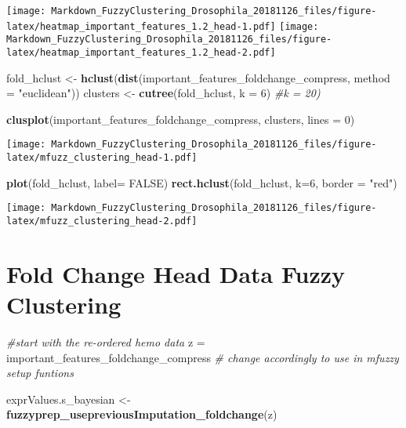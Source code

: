 \documentclass[]{article}
\newenvironment{Shaded}{\begin{snugshade}}{\end{snugshade}}
\newcommand{\KeywordTok}[1]{\textcolor[rgb]{0.13,0.29,0.53}{\textbf{#1}}}
\newcommand{\DataTypeTok}[1]{\textcolor[rgb]{0.13,0.29,0.53}{#1}}
\newcommand{\DecValTok}[1]{\textcolor[rgb]{0.00,0.00,0.81}{#1}}
\newcommand{\StringTok}[1]{\textcolor[rgb]{0.31,0.60,0.02}{#1}}
\newcommand{\CommentTok}[1]{\textcolor[rgb]{0.56,0.35,0.01}{\textit{#1}}}
\newcommand{\OtherTok}[1]{\textcolor[rgb]{0.56,0.35,0.01}{#1}}
\newcommand{\NormalTok}[1]{#1}
\begin{document}
\texttt{[image: Markdown\_FuzzyClustering\_Drosophila\_20181126\_files/figure-latex/heatmap\_important\_features\_1.2\_head-1.pdf]}
\texttt{[image: Markdown\_FuzzyClustering\_Drosophila\_20181126\_files/figure-latex/heatmap\_important\_features\_1.2\_head-2.pdf]}

\begin{Shaded}
\begin{Highlighting}[]
\NormalTok{fold_hclust <-}\StringTok{ }\KeywordTok{hclust}\NormalTok{(}\KeywordTok{dist}\NormalTok{(important_features_foldchange_compress, }\DataTypeTok{method =} \StringTok{"euclidean"}\NormalTok{))}
\NormalTok{clusters <-}\StringTok{ }\KeywordTok{cutree}\NormalTok{(fold_hclust, }\DataTypeTok{k =} \DecValTok{6}\NormalTok{) }\CommentTok{#k = 20)}

\KeywordTok{clusplot}\NormalTok{(important_features_foldchange_compress, clusters, }\DataTypeTok{lines =} \DecValTok{0}\NormalTok{)}
\end{Highlighting}
\end{Shaded}

\texttt{[image: Markdown\_FuzzyClustering\_Drosophila\_20181126\_files/figure-latex/mfuzz\_clustering\_head-1.pdf]}

\begin{Shaded}
\begin{Highlighting}[]
\KeywordTok{plot}\NormalTok{(fold_hclust, }\DataTypeTok{label=} \OtherTok{FALSE}\NormalTok{)}
\KeywordTok{rect.hclust}\NormalTok{(fold_hclust, }\DataTypeTok{k=}\DecValTok{6}\NormalTok{, }\DataTypeTok{border =} \StringTok{"red"}\NormalTok{)}
\end{Highlighting}
\end{Shaded}

\texttt{[image: Markdown\_FuzzyClustering\_Drosophila\_20181126\_files/figure-latex/mfuzz\_clustering\_head-2.pdf]}

\section{Fold Change Head Data Fuzzy
Clustering}\label{fold-change-head-data-fuzzy-clustering}

\begin{Shaded}
\begin{Highlighting}[]
\CommentTok{#start with the re-ordered hemo data}
\NormalTok{z =}\StringTok{ }\NormalTok{important_features_foldchange_compress }\CommentTok{# change accordingly to use in mfuzzy setup funtions}

\NormalTok{exprValues.s_bayesian <-}\StringTok{ }\KeywordTok{fuzzyprep_usepreviousImputation_foldchange}\NormalTok{(z)}
\end{Highlighting}
\end{Shaded}
\end{document}
